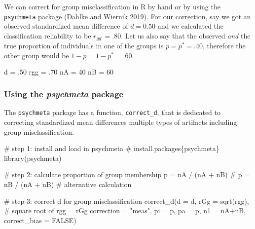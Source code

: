 \documentclass[
  letterpaper,
  DIV=11,
  numbers=noendperiod]{scrreprt}
\newenvironment{Shaded}{\begin{snugshade}}{\end{snugshade}}
\newcommand{\AttributeTok}[1]{\textcolor[rgb]{0.40,0.45,0.13}{#1}}
\newcommand{\CommentTok}[1]{\textcolor[rgb]{0.37,0.37,0.37}{#1}}
\newcommand{\ConstantTok}[1]{\textcolor[rgb]{0.56,0.35,0.01}{#1}}
\newcommand{\DecValTok}[1]{\textcolor[rgb]{0.68,0.00,0.00}{#1}}
\newcommand{\FunctionTok}[1]{\textcolor[rgb]{0.28,0.35,0.67}{#1}}
\newcommand{\NormalTok}[1]{\textcolor[rgb]{0.00,0.23,0.31}{#1}}
\newcommand{\OtherTok}[1]{\textcolor[rgb]{0.00,0.23,0.31}{#1}}
\newcommand{\SpecialCharTok}[1]{\textcolor[rgb]{0.37,0.37,0.37}{#1}}
\newcommand{\StringTok}[1]{\textcolor[rgb]{0.13,0.47,0.30}{#1}}
\begin{document}
We can correct for group misclassification in R by hand or by using the
\texttt{psychmeta} package (Dahlke and Wiernik 2019). For our
correction, say we got an observed standardized mean difference of
\(d = 0.50\) and we calculated the classification reliability to be
\(r_{gg'} = .80\). Let us also say that the observed \emph{and} the true
proportion of individuals in one of the groups is \(p=p^*=.40\),
therefore the other group would be \(1-p=1-p^*=.60\).

\begin{Shaded}
\begin{Highlighting}[]
\NormalTok{d }\OtherTok{=}\NormalTok{ .}\DecValTok{50}
\NormalTok{rgg }\OtherTok{=}\NormalTok{ .}\DecValTok{70}
\NormalTok{nA }\OtherTok{=} \DecValTok{40}
\NormalTok{nB }\OtherTok{=} \DecValTok{60}
\end{Highlighting}
\end{Shaded}

\hypertarget{using-the-psychmeta-package}{%
\subsubsection*{\texorpdfstring{Using the \emph{psychmeta}
package}{Using the psychmeta package}}\label{using-the-psychmeta-package}}

The \texttt{psychmeta} package has a function, \texttt{correct\_d}, that
is dedicated to correcting standardized mean differences multiple types
of artifacts including group misclassification.

\begin{Shaded}
\begin{Highlighting}[]
\CommentTok{\# step 1: install and load in psychmeta}
\CommentTok{\# install.packages\{\textquotesingle{}psychmeta\textquotesingle{}\}}
\FunctionTok{library}\NormalTok{(psychmeta)}

\CommentTok{\# step 2: calculate proportion of group membership}
\NormalTok{p }\OtherTok{=}\NormalTok{ nA }\SpecialCharTok{/}\NormalTok{ (nA }\SpecialCharTok{+}\NormalTok{ nB)}
\CommentTok{\# p = nB / (nA + nB) \# alternative calculation}

\CommentTok{\# step 3: correct d for group misclassification}
\FunctionTok{correct\_d}\NormalTok{(}\AttributeTok{d =}\NormalTok{ d,}
          \AttributeTok{rGg =} \FunctionTok{sqrt}\NormalTok{(rgg), }\CommentTok{\# square root of rgg = rGg}
          \AttributeTok{correction =} \StringTok{"meas"}\NormalTok{,}
          \AttributeTok{pi =}\NormalTok{ p,}
          \AttributeTok{pa =}\NormalTok{ p,}
          \AttributeTok{n1 =}\NormalTok{ nA}\SpecialCharTok{+}\NormalTok{nB,}
          \AttributeTok{correct\_bias =} \ConstantTok{FALSE}\NormalTok{)}
\end{Highlighting}
\end{Shaded}
\end{document}
